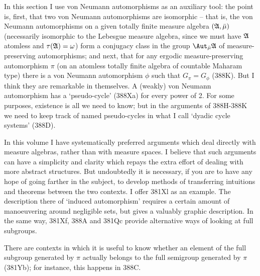{In this section I use von Neumann automorphisms as an auxiliary tool:
the point is, first, that two von Neumann automorphisms are isomorphic
-- that is, the von Neumann automorphisms on a given totally finite
measure algebra $(\frak A,\bar\mu)$ (necessarily isomorphic to the
Lebesgue measure algebra, since we must have $\frak A$ atomless and
$\tau(\frak A)=\omega$) form a conjugacy class in the group
$\Aut_{\bar\mu}\frak A$ of measure-preserving automorphisms;  and next,
that for any ergodic measure-preserving automorphism $\pi$ (on an
atomless totally finite algebra of countable Maharam type) there is a
von Neumann automorphism $\phi$ such that $G_{\pi}=G_{\phi}$ (388K).
But I think they are remarkable in themselves.   A
(weakly) von Neumann automorphism has a `pseudo-cycle' (388Xa) for
every power of 2.   For some purposes, existence is all we need to know;
but in the arguments of 388H-388K we need to keep track of named
pseudo-cycles in what I call `dyadic cycle systems' (388D).
     
In this volume I have systematically preferred arguments which deal
directly with measure algebras, rather than with measure spaces.   I
believe that such arguments can have a simplicity and clarity which
repays the extra effort of dealing with more abstract structures.   But
undoubtedly it is necessary, if you are to have any hope of going
farther in the subject, to develop methods of transferring intuitions
and theorems between the two contexts.   I offer 381Xl as an example.
The description there of `induced automorphism' requires a certain
amount of manoeuvering around negligible sets, but gives a
valuably graphic description.   In the same way, 381Xf, 388A and 381Qc
provide alternative ways of looking at full subgroups.
     
There are contexts in which it is useful to know whether an element of
the full subgroup generated by $\pi$ actually belongs to the full
semigroup generated by $\pi$ (381Yb);  for instance, this happens in
388C.
}%
     
     
\frnewpage
     
